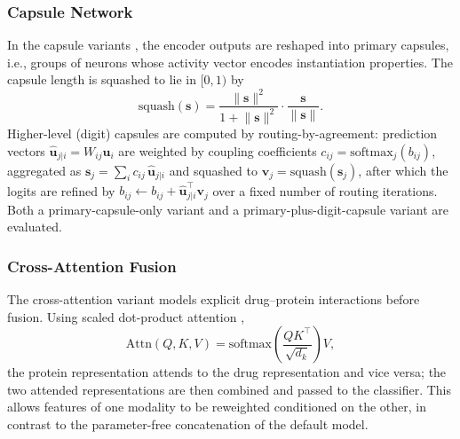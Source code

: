 \documentclass[conference]{IEEEtran}
\begin{document}
\subsubsection{Capsule Network}
In the capsule variants \cite{ref_capsule}, the encoder outputs are reshaped into
primary capsules, i.e., groups of neurons whose activity vector encodes
instantiation properties. The capsule length is squashed to lie in $[0,1)$ by
\begin{equation}
\mathrm{squash}(\mathbf{s}) =
\frac{\lVert \mathbf{s}\rVert^{2}}{1 + \lVert \mathbf{s}\rVert^{2}}
\cdot \frac{\mathbf{s}}{\lVert \mathbf{s}\rVert}.
\label{eq:squash}
\end{equation}
Higher-level (digit) capsules are computed by routing-by-agreement: prediction
vectors $\hat{\mathbf{u}}_{j|i} = W_{ij}\mathbf{u}_{i}$ are weighted by coupling
coefficients $c_{ij} = \mathrm{softmax}_{j}(b_{ij})$, aggregated as
$\mathbf{s}_{j} = \sum_{i} c_{ij}\,\hat{\mathbf{u}}_{j|i}$ and squashed to
$\mathbf{v}_{j} = \mathrm{squash}(\mathbf{s}_{j})$, after which the logits are
refined by $b_{ij} \leftarrow b_{ij} +
\hat{\mathbf{u}}_{j|i}^{\top}\mathbf{v}_{j}$ over a fixed number of routing
iterations. Both a primary-capsule-only variant and a primary-plus-digit-capsule
variant are evaluated.

\subsubsection{Cross-Attention Fusion}
The cross-attention variant models explicit drug--protein interactions before
fusion. Using scaled dot-product attention \cite{ref_vaswani},
\begin{equation}
\mathrm{Attn}(Q,K,V) =
\mathrm{softmax}\!\left(\frac{QK^{\top}}{\sqrt{d_{k}}}\right)V,
\label{eq:attn}
\end{equation}
the protein representation attends to the drug representation and vice versa;
the two attended representations are then combined and passed to the classifier.
This allows features of one modality to be reweighted conditioned on the other,
in contrast to the parameter-free concatenation of the default model.
\end{document}
